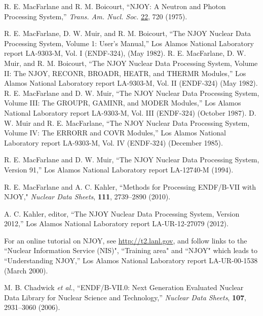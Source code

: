 \documentclass[11pt,twoside]{NJOYMan}
\begin{document}
\begin{thebibliography}{99}
\begin{singlespace}
 R. E. MacFarlane and R. M. Boicourt, ``NJOY:  A
  Neutron and Photon Processing System,'' {\it Trans. Am. Nucl.
  Soc.} \underline{22}, 720 (1975).

 R. E. MacFarlane, D. W. Muir, and R. M. Boicourt,
  ``The NJOY Nuclear Data Processing System, Volume 1:
  User's Manual,'' Los Alamos National Laboratory report
  LA-9303-M, Vol. I (ENDF-324), (May 1982).  R. E. MacFarlane,
  D. W. Muir, and R. M. Boicourt, ``The NJOY Nuclear Data
  Processing System, Volume II: The NJOY, RECONR, BROADR,
  HEATR, and THERMR Modules,'' Los Alamos National Laboratory
  report LA-9303-M, Vol. II (ENDF-324) (May 1982).
  R. E. MacFarlane and D. W. Muir, ``The NJOY Nuclear Data
  Processing System, Volume III: The GROUPR, GAMINR, and
  MODER Modules,'' Los Alamos National Laboratory report
  LA-9303-M, Vol. III (ENDF-324) (October 1987).  D. W. Muir
  and R. E. MacFarlane, ``The NJOY Nuclear Data Processing
  System, Volume IV: The ERRORR and COVR Modules,'' Los Alamos
  National Laboratory report LA-9303-M, Vol. IV (ENDF-324)
  (December 1985).

 R. E. MacFarlane and D. W. Muir, ``The NJOY
  Nuclear Data Processing System, Version 91,'' Los Alamos National
  Laboratory report LA-12740-M (1994).

 R. E. MacFarlane and A. C. Kahler, ``Methods
 for Processing ENDF/B-VII with NJOY," {\it Nuclear Data Sheets},
 {\bf 111}, 2739--2890 (2010).

 A. C. Kahler, editor, ``The NJOY Nuclear Data
  Processing System, Version 2012,'' Los Alamos National
  Laboratory report LA-UR-12-27079 (2012).

 For an online tutorial on NJOY, see
 \href{http://t2.lanl.gov}{http://t2.lanl.gov}, and follow links
 to the ``Nuclear Information Service (NIS)", ``Training area"
 and ``NJOY" which leads to ``Understanding NJOY,'' Los Alamos
 National Laboratory report LA-UR-00-1538 (March 2000).

 M. B. Chadwick {\it et al.}, ``ENDF/B-VII.0:
  Next Generation Evaluated Nuclear Data Library for Nuclear
  Science and Technology,'' {\it Nuclear Data Sheets}, {\bf 107},
  2931--3060 (2006).


\end{singlespace}
\end{thebibliography}
\end{document}
